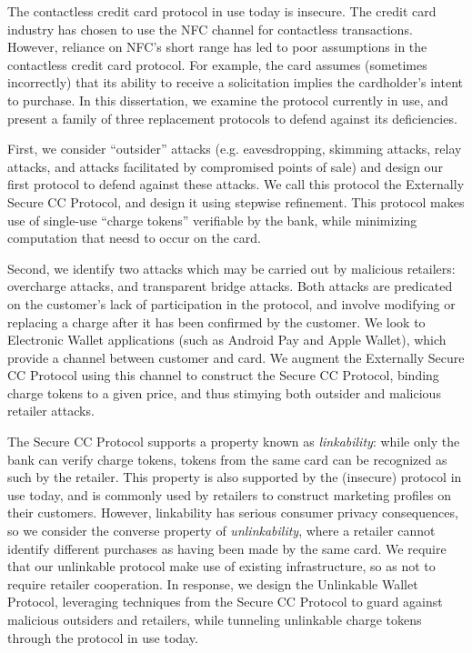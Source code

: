 The contactless credit card protocol in use today is insecure.
The credit card industry has chosen to use the NFC channel for contactless transactions.
However, reliance on NFC's short range has led to poor assumptions in the contactless credit card protocol.
For example, the card assumes (sometimes incorrectly) that its ability to receive a solicitation implies the cardholder's intent to purchase.
In this dissertation, we examine the protocol currently in use,
    and present a family of three replacement protocols to defend against its deficiencies.

First, we consider ``outsider'' attacks (e.g. eavesdropping, skimming attacks, relay attacks, and attacks facilitated by compromised points of sale)
    and design our first protocol to defend against these attacks.
We call this protocol the Externally Secure CC Protocol, and design it using stepwise refinement.
This protocol makes use of single-use ``charge tokens'' verifiable by the bank, while minimizing computation that neesd to occur on the card.

Second, we identify two attacks which may be carried out by malicious retailers:
    overcharge attacks, and transparent bridge attacks.
Both attacks are predicated on the customer's lack of participation in the protocol,
    and involve modifying or replacing a charge after it has been confirmed by the customer.
We look to Electronic Wallet applications (such as Android Pay and Apple Wallet), which provide a channel between customer and card.
We augment the Externally Secure CC Protocol using this channel to construct the Secure CC Protocol,
    binding charge tokens to a given price, and thus stimying both outsider and malicious retailer attacks.

The Secure CC Protocol supports a property known as \emph{linkability}:
    while only the bank can verify charge tokens, tokens from the same card can be recognized as such by the retailer.
This property is also supported by the (insecure) protocol in use today,
    and is commonly used by retailers to construct marketing profiles on their customers.
However, linkability has serious consumer privacy consequences, so we consider the converse property of
    \emph{unlinkability}, where a retailer cannot identify different purchases as having been made by the same card.
We require that our unlinkable protocol make use of existing infrastructure, so as not to require retailer cooperation.
In response, we design the Unlinkable Wallet Protocol,
    leveraging techniques from the Secure CC Protocol to guard against malicious outsiders and retailers,
    while tunneling unlinkable charge tokens through the protocol in use today.
